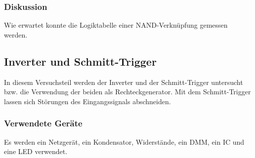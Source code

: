 \documentclass[12pt,a4paper]{article}
\begin{document}
\subsubsection*{Diskussion}

Wie erwartet konnte die Logiktabelle einer NAND-Verknüpfung gemessen werden.

\subsection{Inverter und Schmitt-Trigger}

In diesem Versuchsteil werden der Inverter und der Schmitt-Trigger untersucht bzw. die Verwendung der beiden als Rechteckgenerator. Mit dem Schmitt-Trigger lassen sich Störungen des Eingangssignals abschneiden.

\subsubsection*{Verwendete Geräte}

Es werden ein Netzgerät, ein Kondensator, Widerstände, ein DMM, ein IC und eine LED verwendet.
\end{document}
